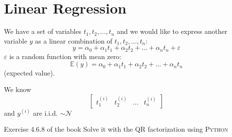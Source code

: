 \section{Linear Regression}





We have a set of variables $t_1, t_2, \ldots, t_n$ and we would like to express another variable $y$ as a linear combination of $t_1, t_2, \ldots, t_n$:
\[
y = \alpha_0 + \alpha_1 t_1 + \alpha_2 t_2 + \ldots + \alpha_n t_n + \varepsilon
\]
$\varepsilon$ is a random function with mean zero:
\[
\mathbb{E}(y) = \alpha_0 + \alpha_1 t_1 + \alpha_2 t_2 + \ldots + \alpha_n t_n
\]
(expected value).

We know
\[
\begin{bmatrix}
t_1^{(i)} & t_2^{(i)} & \ldots & t_n^{(i)}
\end{bmatrix}
\]
and $y^{(i)}$ are i.i.d. $\sim \mathcal{N}$

\begin{mdframed}[backgroundcolor=blue!20]
Exercise 4.6.8 of the book
Solve it with the QR factorization using \textsc{Python}
\end{mdframed}

